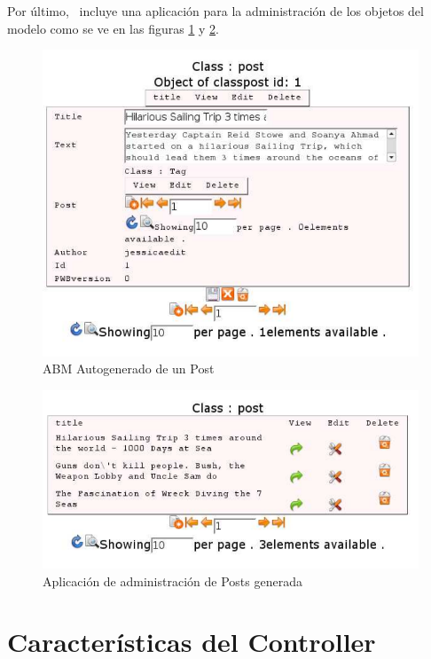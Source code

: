 Por último, \PWB \ incluye una aplicación para la administración de los objetos del modelo como se ve en las figuras \ref{fig-abm1} y \ref{fig-abm2}.

\begin{figure}[h]
	\centering
	\includegraphics[scale=0.7]{images/abm1.pdf}
 	\caption{ABM Autogenerado de un Post}
 	\label{fig-abm1}
\end{figure}

\begin{figure}[h]
	\centering
	\includegraphics[scale=0.7]{images/abm2.pdf}
 	\caption{Aplicación de administración de Posts generada}
 	\label{fig-abm2}
\end{figure}


\section{Características del Controller}
\label{sec-controller}


